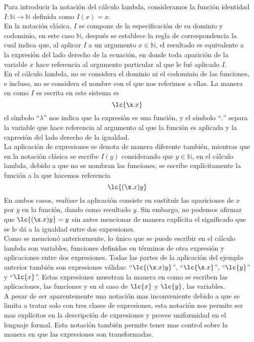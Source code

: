 Para introducir la notación del cálculo lambda, consideramos la función
identidad \(I : \mathbb{N} \to \mathbb{N}\) definida como \(I(x)=x\).\\

En la notación clásica, \(I\) se compone de la especificación de su dominio y
codominio, en este caso \(\mathbb{N}\), después se establece la regla de
correspondencia la cual indica que, al aplicar \(I\) a un argumento \(x\in
\mathbb{N}\), el resultado es equivalente a la expresión del lado derecho de
la ecuación, en donde toda aparición de la variable \(x\) hace referencia al
argumento particular al que le fué aplicado \(I\).\\

En el cálculo lambda, no se considera el dominio ni el codominio de las
funciones, e incluso, no se considera el nombre con el que nos referimos a
ellas. La manera en como \(I\) es escrita en este sistema es \[\lc{\x.x}\] el
símbolo ``\(\lambda\)'' nos indica que la expresión es una función, y el símbolo
``\(.\)'' separa la variable que hace referencia al argumento al que la función
es aplicada y la expresión del lado derecho de la igualdad.\\

La aplicación de expresiones se denota de manera diferente también, mientras que
en la notación clásica se escribe \(I(y)\) considerando que \(y\in \mathbb{N}\),
en el cálculo lambda, debido a que no se nombran las funciones, se escribe
explícitamente la función a la que hacemos referencia \[\lc{(\x.x)y}\] En ambos
casos, \emph{realizar} la aplicación consiste en sustituír las apariciones de
\(x\) por \(y\) en la función, dando como resultado \(y\). Sin embargo, no
podemos afirmar que \(\lc{(\x.x)y}=y\) sin antes mencionar de manera explícita
el significado que se le dá a la igualdad entre dos expresiones.\\

Como se mencionó anteriormente, lo único que se puede escribir en el cálculo
lambda son variables, funciones definidas en términos de otra expresión y
aplicaciones entre dos expresiones. Todas las partes de la aplicación del ejemplo
anterior también son expresiones válidas: ``\(\lc{(\x.x)y}\)'',
``\(\lc{\x.x}\)'', ``\(\lc{y}\)'' y ``\(\lc{x}\)''. Estas expresiones muestran
la manera en como se escriben las aplicaciones, las funciones y en el caso de
\(\lc{x}\) y \(\lc{y}\), las variables.\\

A pesar de ser aparentemente una notación mas inconveniente debido a que se
limita a tratar solo con tres clases de expresiones, esta notación nos permite
ser mas explícitos en la descripción de expresiones y provee uniformidad en el
lenguaje formal. Esta notación también permite tener mas control sobre la manera
en que las expresiones son transformadas.\\

